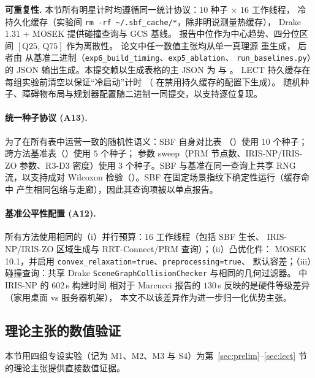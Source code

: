 \documentclass[journal]{IEEEtran}
\begin{document}
\textbf{可重复性.}
本节所有明星计时均遵循同一统计协议：$10$ 种子 $\times$ $16$ 工作线程，
冷持久化缓存（实验间 \texttt{rm -rf \textasciitilde/.sbf\_cache/*}，除非明说测量热缓存），
Drake 1.31 + MOSEK 提供碰撞查询与 GCS 基线。
报告中位作为中心趋势、四分位区间 $[\text{Q25},\,\text{Q75}]$ 作为离散性。
论文中任一数值主张均从单一真理源
 重生成，
后者由 
从基准二进制（\texttt{exp6\_build\_timing}、\texttt{exp5\_ablation}、
\texttt{run\_baselines.py}）的 JSON 输出生成。本提交赖以生成表格的主 JSON 为
 与
。
LECT 持久缓存在每组实验前清空以保证“冷启动”计时
（ 在禁用持久缓存的配置下生成）。
随机种子、障碍物布局与规划器配置随二进制一同提交，以支持逐位复现。

\paragraph{统一种子协议 (A13).}
为了在所有表中运营一致的随机性语义：SBF 自身对比表
（）使用 $10$ 个种子；
跨方法基准表（）使用 $5$ 个种子；
参数 sweep（PRM 节点数、IRIS-NP/IRIS-ZO 参数、R3-D3 密度）使用
$3$ 个种子。SBF 与基准在同一查询上共享 RNG 流，以支持成对 Wilcoxon
检验（）。SBF 在固定场景指纹下确定性运行（缓存命中
产生相同包络与走廊），因此其查询项被以单点报告。

\paragraph{基准公平性配置 (A12).}
所有方法使用相同的（i）并行预算：$16$ 工作线程（包括 SBF 生长、
IRIS-NP/IRIS-ZO 区域生成与 RRT-Connect/PRM 查询）；（ii）凸优化件：
MOSEK 10.1，并启用 \texttt{convex\_relaxation=true}、\texttt{preprocessing=true}、
默认容差；（iii）碰撞查询：共享 Drake \texttt{SceneGraphCollisionChecker}
与相同的几何过滤器。 中 IRIS-NP 的 $602$\,s 构建时间
相对于 Marcucci 报告的 $130$\,s 反映的是硬件等级差异（家用桌面 vs 服务器机架），
本文不以该差异作为进一步归一化优势主张。

\subsection{理论主张的数值验证}\label{sec:theory_validation}

本节用四组专设实验（记为 M1、M2、M3 与 S4）为第~\ref{sec:prelim}--\ref{sec:lect}
节的理论主张提供直接数值证据。
\end{document}
